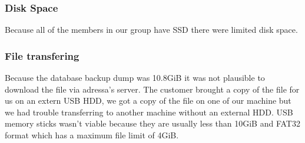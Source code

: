 \subsubsection{Disk Space}
Because all of the members in our group have SSD there were limited disk space.


\subsubsection{File transfering}
Because the database backup dump was 10.8GiB it was not plausible to download the file via adressa's server. The customer brought a copy of the file for us on an extern USB HDD, we got a copy of the file on one of our machine but we had trouble transferring to another machine without an external HDD. USB memory sticks wasn't viable because they are usually less than 10GiB and FAT32 format which has a maximum file limit of 4GiB. 
